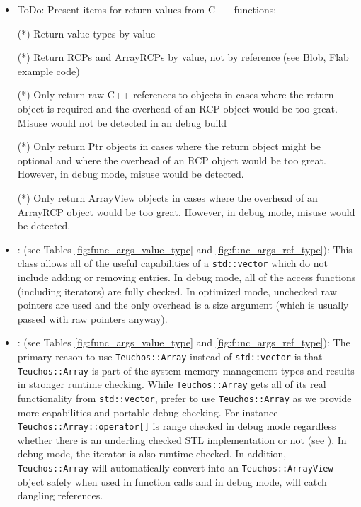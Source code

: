 \begin{itemize}
{}\item ToDo: Present items for return values from C++ functions:

(*) Return value-types by value

(*) Return RCPs and ArrayRCPs by value, not by reference (see Blob,
Flab example code)

(*) Only return raw C++ references to objects in cases where the
return object is required and the overhead of an RCP object would be
too great.  Misuse would not be detected in an debug build

(*) Only return Ptr objects in cases where the return object might be
optional and where the overhead of an RCP object would be too great.
However, in debug mode, misuse would be detected.

(*) Only return ArrayView objects in cases where the overhead of an
ArrayRCP object would be too great.  However, in debug mode, misuse
would be detected.

{}\item\GCGTeuchosArrayView: (see Tables
{}\ref{fig:func_args_value_type} and {}\ref{fig:func_args_ref_type}):
This class allows all of the useful capabilities of a
{}\texttt{std::vector} which do not include adding or removing
entries.  In debug mode, all of the access functions (including
iterators) are fully checked.  In optimized mode, unchecked raw
pointers are used and the only overhead is a size argument (which is
usually passed with raw pointers anyway).

{}\item\GCGTeuchosArray: (see Tables {}\ref{fig:func_args_value_type}
and {}\ref{fig:func_args_ref_type}): The primary reason to use
{}\texttt{Teuchos::\-Array} instead of {}\texttt{std::\-vector} is
that {}\texttt{Teuchos::\-Array} is part of the system memory
management types and results in stronger runtime checking.  While
{}\texttt{Teuchos::\-Array} gets all of its real functionality from
{}\texttt{std::\-vector}, prefer to use {}\texttt{Teuchos::\-Array} as
we provide more capabilities and portable debug checking.  For
instance {}\texttt{Teuchos::\-Array::\-operator[]} is range checked in
debug mode regardless whether there is an underling checked STL
implementation or not (see {}\cite[Item 83]{C++CodingStandards05}).
In debug mode, the iterator is also runtime checked.  In addition,
{}\texttt{Teuchos\-::Array} will automatically convert into an
{}\texttt{Teuchos\-::ArrayView} object safely when used in function
calls and in debug mode, will catch dangling references.


\end{itemize}
